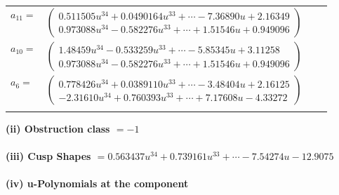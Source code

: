 \documentclass[1p]{elsarticle_modified}
\theoremstyle{definition}
\begin{document}
\begin{tabular}{m{7pt} m{180pt} m{7pt} m{180pt} }
\flushright $a_{11}=$&$\begin{pmatrix}0.511505 u^{34}+0.0490164 u^{33}+\cdots-7.36890 u+2.16349\\0.973088 u^{34}-0.582276 u^{33}+\cdots+1.51546 u+0.949096\end{pmatrix}$ \\
\flushright $a_{10}=$&$\begin{pmatrix}1.48459 u^{34}-0.533259 u^{33}+\cdots-5.85345 u+3.11258\\0.973088 u^{34}-0.582276 u^{33}+\cdots+1.51546 u+0.949096\end{pmatrix}$ \\
\flushright $a_{6}=$&$\begin{pmatrix}0.778426 u^{34}+0.0389110 u^{33}+\cdots-3.48404 u+2.16125\\-2.31610 u^{34}+0.760393 u^{33}+\cdots+7.17608 u-4.33272\end{pmatrix}$\\&\end{tabular}
\flushleft \textbf{(ii) Obstruction class $= -1$}\\~\\
\flushleft \textbf{(iii) Cusp Shapes $= 0.563437 u^{34}+0.739161 u^{33}+\cdots-7.54274 u-12.9075$}\\~\\
\newpage\renewcommand{\arraystretch}{1}
\flushleft \textbf{(iv) u-Polynomials at the component}\newline \\
\end{document}

